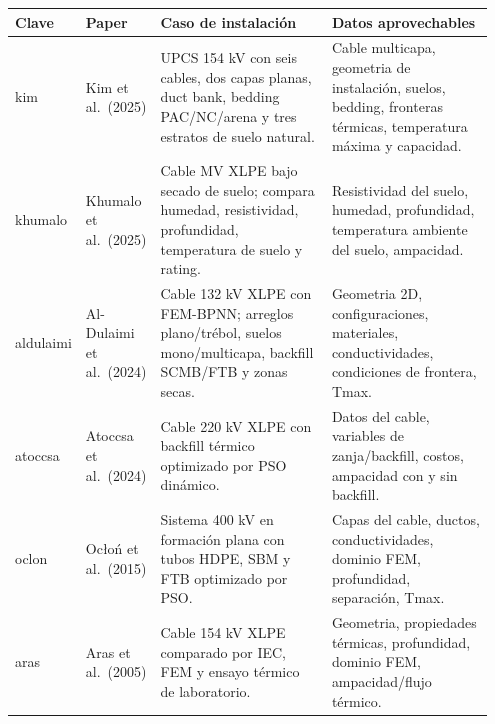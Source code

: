 \documentclass[11pt,a4paper,oneside]{report}
\begin{document}
\begin{longtable}[]{@{}
  >{\RaggedRight\arraybackslash}p{0.11\linewidth}
  >{\RaggedRight\arraybackslash}p{0.14\linewidth}
  >{\RaggedRight\arraybackslash}p{0.36\linewidth}
  >{\RaggedRight\arraybackslash}p{0.34\linewidth}@{}}
\toprule\noalign{}
\begin{minipage}[b]{\linewidth}\raggedright
Clave
\end{minipage} & \begin{minipage}[b]{\linewidth}\raggedright
Paper
\end{minipage} & \begin{minipage}[b]{\linewidth}\raggedright
Caso de instalación
\end{minipage} & \begin{minipage}[b]{\linewidth}\raggedright
Datos aprovechables
\end{minipage} \\
\midrule\noalign{}
\endhead
\bottomrule\noalign{}
\endlastfoot
kim\-2025 & Kim et al.~(2025) & UPCS 154 kV con seis cables, dos capas
planas, duct bank, bedding PAC/NC/arena y tres estratos de suelo
natural. & Cable multicapa, geometria de instalación, suelos, bedding,
fronteras térmicas, temperatura máxima y capacidad. \\
khumalo\-2025 & Khumalo et al.~(2025) & Cable MV XLPE bajo secado de
suelo; compara humedad, resistividad, profundidad, temperatura de suelo
y rating. & Resistividad del suelo, humedad, profundidad, temperatura
ambiente del suelo, ampacidad. \\
aldulaimi\-2024 & Al-Dulaimi et al.~(2024) & Cable 132 kV XLPE con
FEM-BPNN; arreglos plano/trébol, suelos mono/multicapa, backfill
SCMB/FTB y zonas secas. & Geometria 2D, configuraciones, materiales,
conductividades, condiciones de frontera, Tmax. \\
atoccsa\-2024 & Atoccsa et al.~(2024) & Cable 220 kV XLPE con backfill
térmico optimizado por PSO dinámico. & Datos del cable, variables de
zanja/backfill, costos, ampacidad con y sin backfill. \\
oclon\-2015 & Ocłoń et al.~(2015) & Sistema 400 kV en formación plana con
tubos HDPE, SBM y FTB optimizado por PSO. & Capas del cable, ductos,
conductividades, dominio FEM, profundidad, separación, Tmax. \\
aras\-2005 & Aras et al.~(2005) & Cable 154 kV XLPE comparado por IEC, FEM
y ensayo térmico de laboratorio. & Geometria, propiedades térmicas,
profundidad, dominio FEM, ampacidad/flujo térmico. \\
\end{longtable}
\end{document}
